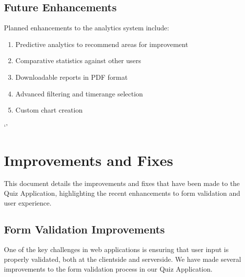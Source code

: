\documentclass[letterpaper,10pt,english]{sphinxmanual}
\begin{document}
\subsection{Future Enhancements}
\label{\detokenize{analytics:future-enhancements}}
\sphinxAtStartPar
Planned enhancements to the analytics system include:
\begin{enumerate}
%
\item {} 
\sphinxAtStartPar
Predictive analytics to recommend areas for improvement

\item {} 
\sphinxAtStartPar
Comparative statistics against other users

\item {} 
\sphinxAtStartPar
Downloadable reports in PDF format

\item {} 
\sphinxAtStartPar
Advanced filtering and time\sphinxhyphen{}range selection

\item {} 
\sphinxAtStartPar
Custom chart creation

\end{enumerate}

\sphinxAtStartPar
‘’

\sphinxstepscope


\section{Improvements and Fixes}
\label{\detokenize{improvements:improvements-and-fixes}}\label{\detokenize{improvements::doc}}
\sphinxAtStartPar
This document details the improvements and fixes that have been made to the Quiz Application,
highlighting the recent enhancements to form validation and user experience.


\subsection{Form Validation Improvements}
\label{\detokenize{improvements:form-validation-improvements}}
\sphinxAtStartPar
One of the key challenges in web applications is ensuring that user input is properly validated,
both at the client\sphinxhyphen{}side and server\sphinxhyphen{}side. We have made several improvements to the form validation
process in our Quiz Application.
\end{document}
